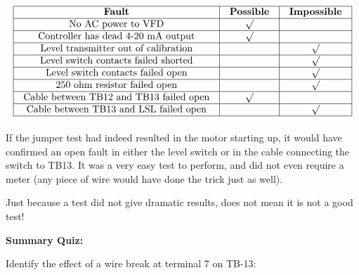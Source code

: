 






$$\vbox{\offinterlineskip
\halign{\strut
\vrule \quad\hfil # \ \hfil & 
\vrule \quad\hfil # \ \hfil & 
\vrule \quad\hfil # \ \hfil \vrule \cr
\noalign{\hrule}
%
{\bf Fault} & {\bf Possible} & {\bf Impossible} \cr
%
\noalign{\hrule}
%
No AC power to VFD & $\surd$ &  \cr
%
\noalign{\hrule}
%
Controller has dead 4-20 mA output & $\surd$ &  \cr
%
\noalign{\hrule}
%
Level transmitter out of calibration &  & $\surd$ \cr
%
\noalign{\hrule}
%
Level switch contacts failed shorted &  & $\surd$ \cr
%
\noalign{\hrule}
%
Level switch contacts failed open &  & $\surd$ \cr
%
\noalign{\hrule}
%
250 ohm resistor failed open &  & $\surd$ \cr
%
\noalign{\hrule}
%
Cable between TB12 and TB13 failed open & $\surd$ &  \cr
%
\noalign{\hrule}
%
Cable between TB13 and LSL failed open &  & $\surd$ \cr
%
\noalign{\hrule}
} %
}$$ %







If the jumper test had indeed resulted in the motor starting up, it would have confirmed an open fault in either the level switch or in the cable connecting the switch to TB13.  It was a very easy test to perform, and did not even require a meter (any piece of wire would have done the trick just as well).  

Just because a test did not give dramatic results, does not mean it is not a good test!

\vfil \eject

\noindent
{\bf Summary Quiz:}

Identify the effect of a wire break at terminal 7 on TB-13:

